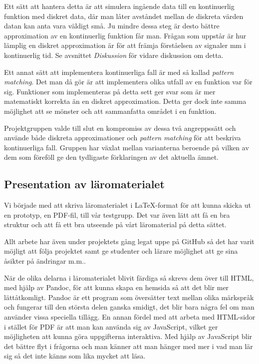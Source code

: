 \documentclass[]{article}
\begin{document}
Ett sätt att hantera detta är att simulera ingående data till en  kontinuerlig funktion med diskret data, där
man låter avståndet mellan de diskreta värden datan kan anta vara väldigt små. Ju mindre dessa steg är desto bättre
approximation av en kontinuerlig funktion får man. Frågan som uppstår är hur lämplig en diskret approximation är för
att främja förståelsen av signaler mm i kontinuerlig tid. Se avsnittet \textit{Diskussion} för vidare diskussion om detta.

Ett annat sätt att implementera kontinuerliga fall är med så kallad \textit{pattern matching}. Det man då gör är att
implementera olika utfall av en funktion var för sig. Funktioner som implementeras på detta sett ger svar som är mer
matematiskt korrekta än en diskret approximation. Detta ger dock inte samma möjlighet att se mönster och att sammanfatta
området i en funktion.

Projektgruppen valde till slut en kompromiss av dessa två angreppssätt och använde både diskreta approximationer och
\textit{pattern matching} för att beskriva kontinuerliga fall. Gruppen har växlat mellan varianterna beroende på vilken
av dem som föreföll ge den tydligaste förklaringen av det aktuella ämnet.

\subsection{Presentation av läromaterialet}
Vi började med att skriva läromaterialet i LaTeX-format för att kunna skicka ut en prototyp, en PDF-fil, till vår
testgrupp. Det var även lätt att få en bra struktur och att få ett bra utseende på vårt läromaterial på detta sättet.

Allt arbete har även under projektets gång legat uppe på GitHub så det har varit möjligt att följa projektet samt ge
studenter och lärare möjlighet att ge sina åsikter på ändringar m.m..

När de olika delarna i läromaterialet blivit färdiga så skrevs dem över till HTML, med hjälp av Pandoc, för att kunna
skapa en hemsida så att det blir mer lättåtkomligt. Pandoc är ett program som översätter text mellan olika märkspråk och
fungerar till den största delen ganska smidigt, det blir bara några fel om man använder vissa speciella tillägg. En
annan fördel med att arbeta med HTML-sidor i stället för PDF är att man kan använda sig av JavaScript, vilket ger
möjligheten att kunna göra uppgifterna interaktiva. Med hjälp av JavaScript blir det bättre flyt i frågorna och man
känner att man hänger med mer i vad man lär sig så det inte känns som lika mycket att läsa.
\end{document}

